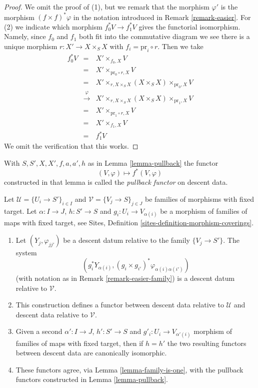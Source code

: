 \begin{proof}
We omit the proof of (1), but we remark that the morphism
$\varphi'$ is the morphism $(f \times f)^*\varphi$ in the
notation introduced in Remark \ref{remark-easier}.
For (2) we indicate which morphism
$f_0^*V \to f_1^*V$ gives the functorial isomorphism. Namely,
since $f_0$ and $f_1$ both fit into the commutative diagram
we see there is a unique morphism $r : X' \to X \times_S X$
with $f_i = \text{pr}_i \circ r$. Then we take
\begin{eqnarray*}
f_0^*V & = &
X' \times_{f_0, X} V \\
& = &
X' \times_{\text{pr}_0 \circ r, X} V \\
& = &
X' \times_{r, X \times_S X} (X \times_S X) \times_{\text{pr}_0, X} V \\
& \xrightarrow{\varphi} &
X' \times_{r, X \times_S X} (X \times_S X) \times_{\text{pr}_1, X} V \\
& = &
X' \times_{\text{pr}_1 \circ r, X} V \\
& = &
X' \times_{f_1, X} V \\
& = & f_1^*V
\end{eqnarray*}
We omit the verification that this works.
\end{proof}

\begin{definition}
\label{definition-pullback-functor}
With $S, S', X, X', f, a, a', h$ as in Lemma \ref{lemma-pullback} the functor
$$
(V, \varphi) \longmapsto f^*(V, \varphi)
$$
constructed in that lemma is called the {\it pullback functor} on descent data.
\end{definition}

\begin{lemma}
\label{lemma-pullback-family}
Let $\mathcal{U} = \{U_i \to S'\}_{i \in I}$ and
$\mathcal{V} = \{V_j \to S\}_{j \in J}$ be families of morphisms with
fixed target. Let $\alpha : I \to J$, $h : S' \to S$ and
$g_i : U_i \to V_{\alpha(i)}$ be a morphism of families
of maps with fixed target, see
Sites, Definition \ref{sites-definition-morphism-coverings}.
\begin{enumerate}
\item Let $(Y_j, \varphi_{jj'})$ be a descent datum relative to the
family $\{V_j \to S'\}$. The system
$$
\left(
g_i^*Y_{\alpha(i)},
(g_i \times g_{i'})^*\varphi_{\alpha(i)\alpha(i')}
\right)
$$
(with notation as in Remark \ref{remark-easier-family})
is a descent datum relative to $\mathcal{V}$.
\item This construction defines a functor between descent data relative
to $\mathcal{U}$ and descent data relative to $\mathcal{V}$.
\item Given a second $\alpha' : I \to J$, $h' : S' \to S$ and
$g'_i : U_i \to V_{\alpha'(i)}$ morphism of families
of maps with fixed target, then if $h = h'$ the two resulting functors
between descent data are canonically isomorphic.
\item These functors agree, via Lemma \ref{lemma-family-is-one},
with the pullback functors constructed in Lemma \ref{lemma-pullback}.
\end{enumerate}
\end{lemma}


